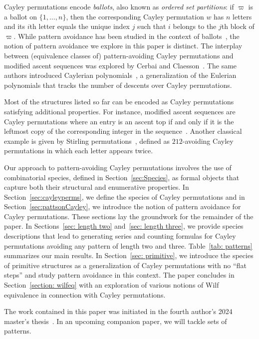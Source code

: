 \documentclass[a4paper, 11pt]{article}
\theoremstyle{definition}
\begin{document}
Cayley permutations encode \emph{ballots}, also known as \emph{ordered set partitions}:
if $\varpi$ is a ballot on $\{1,\ldots,n\}$, then the
corresponding Cayley permutation $w$ has $n$ letters and its $i$th
letter equals the unique index $j$ such that $i$ belongs to the $j$th
block of $\varpi$.
While pattern avoidance has been studied in the context of
ballots~\cite{Birmajer-etal, chen, Godbole2014, KASRAOUI}, the notion of pattern avoidance
we explore in this paper is distinct.
The interplay between (equivalence classes of) pattern-avoiding Cayley permutations
and modified ascent sequences was explored by Cerbai and Claesson~\cite{CC:tpb}.
The same authors introduced Caylerian polynomials~\cite{CC:caypol}, a generalization
of the Eulerian polynomials that tracks the number
of descents over Cayley permutations.

Most of the structures listed so far can be encoded as Cayley 
permutations satisfying additional properties. For instance, modified ascent sequences
are Cayley permutations where
an entry is an ascent top if and only if it is the leftmost copy of the
corresponding integer in the sequence~\cite{CC:tpb}.
Another classical example is given by Stirling permutations~\cite{GS78},
defined as $212$-avoiding Cayley permutations in which each letter appears twice. 

Our approach to pattern-avoiding Cayley permutations
involves the use of combinatorial species, defined in
Section~\ref{sec:Species}, as formal objects that capture both their structural
and enumerative properties.
In Section~\ref{sec:cayleyperms}, we define the species of 
Cayley permutations and in Section~\ref{sec:pattsonCayley}, we introduce the 
notion of pattern avoidance for Cayley permutations. These sections lay the 
groundwork for the remainder of the paper. In Sections~\ref{sec: length two} 
and~\ref{sec: length three}, we provide species
descriptions that lead to generating series and counting formulas for Cayley 
permutations
avoiding any pattern of length two and three. Table~\ref{tab: patterns} summarizes
our main results. 
In Section~\ref{sec: primitive}, we introduce the species of primitive structures as a generalization of Cayley permutations with no ``flat steps'' and study pattern avoidance in this context. 
The paper concludes in Section~\ref{section: wilfeq} with an exploration of various 
notions of Wilf equivalence in connection with Cayley permutations. 

The work contained in this paper was initiated in the fourth author's 2024 master's 
thesis~\cite{Golab2024}. In an upcoming companion paper, we will tackle sets of  patterns.
\end{document}
